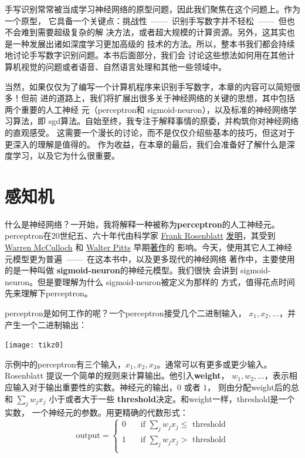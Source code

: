手写识别常常被当成学习神经网络的原型问题，因此我们聚焦在这个问题上。作为一个原型，
它具备一个关键点：挑战性~——~识别手写数字并不轻松~——~但也不会难到需要超级复杂的解
决方法，或者超大规模的计算资源。另外，这其实也是一种发展出诸如深度学习更加高级的
技术的方法。所以，整本书我们都会持续地讨论手写数字识别问题。本书后面部分，我们会
讨论这些想法如何用在其他计算机视觉的问题或者语音、自然语言处理和其他一些领域中。

当然，如果仅仅为了编写一个计算机程序来识别手写数字，本章的内容可以简短很多！但前
进的道路上，我们将扩展出很多关于神经网络的关键的思想，其中包括两个重要的人工神经
元（\gls*{perceptron}和 \gls*{sigmoid-neuron}），以及标准的神经网络学习算法，即%
\gls*{sgd}算法。自始至终，我专注于解释事情的原委，并构筑你对神经网络的直观感受。
这需要一个漫长的讨论，而不是仅仅介绍些基本的技巧，但这对于更深入的理解是值得的。
作为收益，在本章的最后，我们会准备好了解什么是深度学习，以及它为什么很重要。

\section{感知机}
\label{sec:Perceptrons}

什么是神经网络？一开始，我将解释一种被称为\textbf{\gls{perceptron}}的人工神经元。%
\gls*{perceptron}在20世纪五、六十年代由科学家
\href{http://en.wikipedia.org/wiki/Frank_Rosenblatt}{Frank Rosenblatt}
\href{http://books.google.ca/books/about/Principles_of_neurodynamics.html?id=7FhRAAAAMAAJ}{%
  发明}，其受到 \href{http://en.wikipedia.org/wiki/Warren_McCulloch}{Warren
  McCulloch} 和 \href{http://en.wikipedia.org/wiki/Walter_Pitts}{Walter Pitts}
早期\href{http://scholar.google.ca/scholar?cluster=4035975255085082870}{著作}的
影响。今天，使用其它人工神经元模型更为普遍~——~在这本书中，以及更多现代的神经网络
著作中，主要使用的是一种叫做 \textbf{\gls{sigmoid-neuron}}的神经元模型。我们很快
会讲到 \gls*{sigmoid-neuron}。但是要理解为什么 \gls*{sigmoid-neuron}被定义为那样的
方式，值得花点时间先来理解下\gls*{perceptron}。

\gls*{perceptron}是如何工作的呢？一个\gls*{perceptron}接受几个二进制输入，
$x_1,x_2,\ldots$，并产生一个二进制输出：
\begin{center}
  \texttt{[image: tikz0]}
\end{center}

示例中的\gls*{perceptron}有三个输入，$x_1,x_2,x_3$。通常可以有更多或更少输入。
Rosenblatt 提议一个简单的规则来计算输出。他引入\textbf{\gls{weight}}，
$w_1,w_2,\ldots$，表示相应输入对于输出重要性的实数。神经元的输出，$0$ 或者 $1$，
则由分配\gls*{weight}后的总和 $\sum_j w_j x_j$ 小于或者大于一些%
\textbf{\gls{threshold}}决定。和\gls*{weight}一样，\gls*{threshold}是一个实数，
一个神经元的参数。用更精确的代数形式：
\begin{equation}
  \text{output} = \begin{cases}
    0 & \quad \text{if } \sum_j w_j x_j \leq \text{ threshold} \\
    1 & \quad \text{if } \sum_j w_j x_j > \text{ threshold} \\
  \end{cases}
  \tag{1}
\end{equation}

